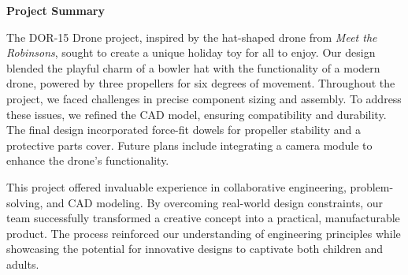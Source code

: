 \begin{center}
\textbf{Project Summary}
\end{center}

The DOR-15 Drone project, inspired by the hat-shaped drone from \textit{Meet the Robinsons}, sought to create a unique holiday toy for all to enjoy. Our design blended the playful charm of a bowler hat with the functionality of a modern drone, powered by three propellers for six degrees of movement. Throughout the project, we faced challenges in precise component sizing and assembly. To address these issues, we refined the CAD model, ensuring compatibility and durability. The final design incorporated force-fit dowels for propeller stability and a protective parts cover. Future plans include integrating a camera module to enhance the drone’s functionality.

This project offered invaluable experience in collaborative engineering, problem-solving, and CAD modeling. By overcoming real-world design constraints, our team successfully transformed a creative concept into a practical, manufacturable product. The process reinforced our understanding of engineering principles while showcasing the potential for innovative designs to captivate both children and adults.
